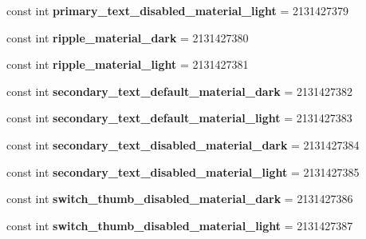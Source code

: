 \begin{DoxyCompactItemize}
\item 
\mbox{\label{classXaria_1_1Resource_1_1Color_a2319a5a121ba95a1baed0ddc4ac16636}} 
const int {\bfseries primary\+\_\+text\+\_\+disabled\+\_\+material\+\_\+light} = 2131427379
\item 
\mbox{\label{classXaria_1_1Resource_1_1Color_a1e7f1140a2cf1e10485673391fa58d7d}} 
const int {\bfseries ripple\+\_\+material\+\_\+dark} = 2131427380
\item 
\mbox{\label{classXaria_1_1Resource_1_1Color_af71afd929b386a89c6198be2d5e797f0}} 
const int {\bfseries ripple\+\_\+material\+\_\+light} = 2131427381
\item 
\mbox{\label{classXaria_1_1Resource_1_1Color_a2a941af100a907364bd443a6fa9983d3}} 
const int {\bfseries secondary\+\_\+text\+\_\+default\+\_\+material\+\_\+dark} = 2131427382
\item 
\mbox{\label{classXaria_1_1Resource_1_1Color_a0c508f4fc87a19cb736ec9601f0ab7f5}} 
const int {\bfseries secondary\+\_\+text\+\_\+default\+\_\+material\+\_\+light} = 2131427383
\item 
\mbox{\label{classXaria_1_1Resource_1_1Color_a9ea8c0bbc54649b2edcd6f6d25fe1734}} 
const int {\bfseries secondary\+\_\+text\+\_\+disabled\+\_\+material\+\_\+dark} = 2131427384
\item 
\mbox{\label{classXaria_1_1Resource_1_1Color_a796f4b9fff1180fc80265d4dba74c6a6}} 
const int {\bfseries secondary\+\_\+text\+\_\+disabled\+\_\+material\+\_\+light} = 2131427385
\item 
\mbox{\label{classXaria_1_1Resource_1_1Color_a92d82fc7f273c0910cd318bac5cf5b31}} 
const int {\bfseries switch\+\_\+thumb\+\_\+disabled\+\_\+material\+\_\+dark} = 2131427386
\item 
\mbox{\label{classXaria_1_1Resource_1_1Color_ae38744ecb7ec5d5080152ca0d92fd85a}} 
const int {\bfseries switch\+\_\+thumb\+\_\+disabled\+\_\+material\+\_\+light} = 2131427387

\end{DoxyCompactItemize}
